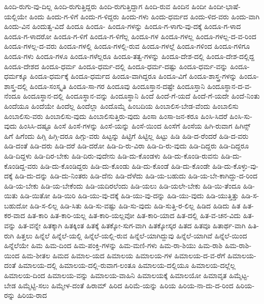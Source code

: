 {ಹಿಂದಿ-ರುಗು-ವು-ದಿಲ್ಲ
ಹಿಂದಿ-ರುಗುತ್ತಿದ್ದರು
ಹಿಂದಿ-ರುಗುತ್ತಿದ್ದಾಗ
ಹಿಂದಿ-ರುವ
ಹಿಂದಿನ
ಹಿಂದೀ
ಹಿಂದೀ-ಭಾಷೆ-ಯಲ್ಲಿಯೇ
ಹಿಂದು
ಹಿಂದು-ಗ-ಳಿಗೆ
ಹಿಂದು-ಗ-ಳಿದ್ದರು
ಹಿಂದು-ಗಳು
ಹಿಂದು-ಧರ್ಮದ
ಹಿಂದು-ಳಿದ-ವರು
ಹಿಂದು-ವಾಗಿ
ಹಿಂದು-ವಿನ
ಹಿಂದುತ್ವ-ವಿದೆ
ಹಿಂದೂ
ಹಿಂದೂ-
ಹಿಂದೂ-ಗಳನ್ನು
ಹಿಂದೂ-ಗ-ಳಾಗು-ವು-ದಕ್ಕೆ
ಹಿಂದೂ-ಗ-ಳಾದ
ಹಿಂದೂ-ಗ-ಳಾದರೋ
ಹಿಂದೂ-ಗ-ಳಿಗೆ
ಹಿಂದೂ-ಗ-ಳಿಗೆಲ್ಲ
ಹಿಂದೂ-ಗಳ
ಹಿಂದೂ-ಗಳಲ್ಲ
ಹಿಂದೂ-ಗಳಲ್ಲ-ದ-ವ-ರಿಂದ
ಹಿಂದೂ-ಗಳಲ್ಲ-ದ-ವರು
ಹಿಂದೂ-ಗಳಲ್ಲಿ
ಹಿಂದೂ-ಗಳಲ್ಲಿ-ರುವ
ಹಿಂದೂ-ಗಳಲ್ಲೆ
ಹಿಂದೂ-ಗಳಿಂದ
ಹಿಂದೂ-ಗಳಿಗೂ
ಹಿಂದೂ-ಗಳು
ಹಿಂದೂ-ಗಳೂ
ಹಿಂದೂ-ಗಳೆಲ್ಲರೂ
ಹಿಂದೂ-ತತ್ವ-ಗಳನ್ನು
ಹಿಂದೂ-ದೇಶ-ದಲ್ಲಿ
ಹಿಂದೂ-ದೇಶ-ದಲ್ಲಿದ್ದ
ಹಿಂದೂ-ದೇಶದ
ಹಿಂದೂ-ಧರ್ಮ
ಹಿಂದೂ-ಧರ್ಮ-ದಲ್ಲಿ
ಹಿಂದೂ-ಧರ್ಮ-ದಷ್ಟು
ಹಿಂದೂ-ಧರ್ಮ-ವನ್ನು
ಹಿಂದೂ-ಧರ್ಮಕ್ಕೂ
ಹಿಂದೂ-ಧರ್ಮಕ್ಕೆ
ಹಿಂದೂ-ಧರ್ಮದ
ಹಿಂದೂ-ವಾಗಿದ್ದರೂ
ಹಿಂದೂ-ವಿಗೆ
ಹಿಂದೂ-ಶಾಸ್ತ್ರ-ಗಳನ್ನು
ಹಿಂದೂ-ಶಾಸ್ತ್ರ-ದಲ್ಲಿ
ಹಿಂದೂ-ಸಂಸ್ಕೃತಿ
ಹಿಂದೂ-ಸಾ-ಗರ
ಹಿಂದೂವು
ಹಿಂದೂಸ್ತಾನ-ದಷ್ಟೇ
ಹಿಂದೂಸ್ತಾನಿ
ಹಿಂದೂಸ್ಥಾನ-ದ-ವ-ನೆಂದೂ
ಹಿಂದೂಸ್ಥಾನ-ದಲ್ಲಿ
ಹಿಂದೂಸ್ಥಾನ-ವನ್ನು
ಹಿಂದೂಸ್ಥಾನಿ
ಹಿಂದೆ
ಹಿಂದೆ-ಗೆ-ಯದೆ
ಹಿಂದೆ-ಗೆ-ಯದೇ
ಹಿಂದೆ-ನಿಂತು
ಹಿಂದೆಯೂ
ಹಿಂದೆಯೇ
ಹಿಂದೆಲ್ಲ
ಹಿಂದೆಲ್ಲಾ
ಹಿಂದೊಮ್ಮೆ
ಹಿಂಬದಿಯ
ಹಿಂಬಾಲಿಸ-ಬೇಡ-ವೆಂದು
ಹಿಂಬಾಲಿಸು
ಹಿಂಬಾಲಿಸು-ವರು
ಹಿಂಬಾಲಿಸು-ವುದು
ಹಿಂಬಾಲಿಸುತ್ತಿರು-ವುದು
ಹಿಂಸಾ
ಹಿಂಸಾ-ಜನ-ಕರೂ
ಹಿಂಸಿ-ಸಿದರೆ
ಹಿಂಸಿ-ಸು-ವುದು
ಹಿಂಸಿಸಿ-ದಷ್ಟೂ
ಹಿಂಸೆ
ಹಿಂಸೆ-ಗಳನ್ನು
ಹಿಂಸೆ-ಯನ್ನು
ಹಿಂಸೆ-ಯಿಂದ
ಹಿಂಸೆಗೆ
ಹಿಂಸೆಯ
ಹಿಗಿ-ರುವಾಗ
ಹಿಗಿನ್ಸ್
ಹಿಗೆ
ಹಿಗೆಂದು
ಹಿಗ್ಗಿ
ಹಿಗ್ಗಿ-ದರೂ
ಹಿಗ್ಗು-ವರು
ಹಿಟ್ಟನ್ನು
ಹಿಟ್ಟಿಗೆ
ಹಿಟ್ಟಿಲ್ಲ
ಹಿಟ್ಟು
ಹಿಡಿ
ಹಿಡಿ-ದ-ರೆಂದರೆ
ಹಿಡಿ-ದ-ವರು
ಹಿಡಿ-ದಂತೆ
ಹಿಡಿ-ದರು
ಹಿಡಿ-ದರೆ
ಹಿಡಿ-ದರೋ
ಹಿಡಿ-ದಿ-ರು-ವಿರಾ
ಹಿಡಿ-ದಿ-ರು-ವುದು
ಹಿಡಿ-ದಿದ್ದರು
ಹಿಡಿ-ದಿದ್ದರೂ
ಹಿಡಿ-ದಿದ್ದಳು
ಹಿಡಿ-ದಿರ-ಬೇಕು
ಹಿಡಿ-ದಿರು-ವುದೇನು
ಹಿಡಿ-ದು-ಕೊಂಡಳು
ಹಿಡಿ-ದು-ಕೊಂಡಿ-ರುವನು
ಹಿಡಿ-ದು-ಕೊಂಡಿದ್ದ-ವರು
ಹಿಡಿ-ದು-ಕೊಂಡಿದ್ದರು
ಹಿಡಿ-ದು-ಕೊಂಡು
ಹಿಡಿ-ದು-ಕೊಂಡೆ
ಹಿಡಿ-ದು-ಕೊಂಡೇ
ಹಿಡಿ-ದು-ಕೊಳ್ಳು-ವು-ದಕ್ಕೆ
ಹಿಡಿ-ದು-ದನ್ನು
ಹಿಡಿ-ದು-ನಿಂತರು
ಹಿಡಿ-ದೆನು
ಹಿಡಿ-ದೆಳೆದು
ಹಿಡಿ-ಯ-ಬಹುದು
ಹಿಡಿ-ಯ-ಬೇ-ಕಾಗಿದ್ದು-ದ-ರಿಂದ
ಹಿಡಿ-ಯ-ಬೇಕು
ಹಿಡಿ-ಯ-ಬೇಕೆಂದು
ಹಿಡಿ-ಯದಿರಲೆಂದು
ಹಿಡಿ-ಯಲು
ಹಿಡಿ-ಯಲೇ-ಬೇಕು
ಹಿಡಿ-ಯಿ-ತೆಂದೂ
ಹಿಡಿ-ಯಿತು
ಹಿಡಿ-ಯಿತೋ
ಹಿಡಿ-ಯಿರಿ
ಹಿಡಿ-ಯು-ವು-ದಕ್ಕೆ
ಹಿಡಿ-ಯು-ವು-ದನ್ನು
ಹಿಡಿ-ಯು-ವುದು
ಹಿಡಿ-ಯುತ್ತಿತ್ತು
ಹಿಡಿ-ಸ-ಬಹುದೋ
ಹಿಡಿ-ಸ-ಲಿಲ್ಲ
ಹಿಡಿ-ಸಿತು
ಹಿಡಿ-ಸು-ವಷ್ಟು
ಹಿಡಿ-ಸು-ವುದು
ಹಿಡಿ-ಸುತ್ತಿ-ರ-ಲಿಲ್ಲ
ಹಿಡಿದ
ಹಿಡಿದು
ಹಿತ
ಹಿತ-ಕರ-ವಾದ
ಹಿತ-ಕಾರಿ
ಹಿತ-ಕಾರಿ-ಯಲ್ಲ
ಹಿತ-ಕಾರಿ-ಯಲ್ಲವೋ
ಹಿತ-ಕಾರಿ-ಯಾದ
ಹಿತ-ದಲ್ಲಿ
ಹಿತ-ವ-ಚನ-ವಿದು
ಹಿತ-ವನ್ನು
ಹಿತ-ವನ್ನೇ
ಹಿತಕ್ಕಾಗಿ
ಹಿತಕ್ಕಿಂತ
ಹಿತಕ್ಕೆ
ಹಿತಕ್ಕೋ-ಸುಗ-ವಾಗಿ
ಹಿತಕ್ಕೋಸ್ಕರ
ಹಿತದ
ಹಿತವೂ
ಹಿತಾರ್ಥ-ವಾಗಿ
ಹಿತಿ-ರುಗಿ
ಹಿತ್ತಲು
ಹಿನ್ನೆಲೆ
ಹಿನ್ನೆಲೆ-ಯಲ್ಲಿ
ಹಿನ್ನೆಲೆ-ಯಲ್ಲಿ-ರುವ
ಹಿನ್ನೆಲೆ-ಯಾಗಿದ್ದುವು
ಹಿನ್ನೆಲೆ-ಯಾಗಿವೆ
ಹಿನ್ನೆಲೆ-ಯಿಂದ
ಹಿನ್ನೆಲೆಯೇ
ಹಿಮ
ಹಿಮ-ದಿಂದ
ಹಿಮ-ಪಂಕ್ತಿ-ಗಳನ್ನು
ಹಿಮ-ಮಣಿ-ಗಳು
ಹಿಮ-ರಾ-ಶಿಯು
ಹಿಮ-ರಾಶಿ
ಹಿಮ-ರಾಶಿ-ಯಿಂದ
ಹಿಮ-ಶೀತಲ
ಹಿಮದ
ಹಿಮಾಲ-ಯದ
ಹಿಮಾಲಯ
ಹಿಮಾಲಯ-ಗಳ
ಹಿಮಾಲಯ-ದ-ವ-ರೆಗೆ
ಹಿಮಾಲಯ-ದಂತೆ
ಹಿಮಾಲಯ-ದಲ್ಲಿ
ಹಿಮಾಲಯ-ದಲ್ಲಿ-ರುವಾಗ-ಲಂತೂ
ಹಿಮಾಲಯ-ದಲ್ಲಿಯೂ
ಹಿಮಾಲಯ-ದಲ್ಲೆಲ್ಲ
ಹಿಮಾಲಯ-ದಿಂದ
ಹಿಮಾಲಯ-ವನ್ನು
ಹಿಮಾಲಯ-ವಾಹಿನಿ
ಹಿಮಾಲಯಕ್ಕೆ
ಹಿಮಾಲಯೋ
ಹಿಮಾವೃತ
ಹಿಮ್ಮೆಟ್ಟ-ಬೇಡ
ಹಿಮ್ಮೆಟ್ಟಿ-ಸಲು
ಹಿಮ್ಮೇಳ-ದಂತೆ
ಹಿರಾಮ್
ಹಿರಿದ
ಹಿರಿಮೆ-ಯನ್ನು
ಹಿರಿಯ
ಹಿರಿಯ-ನಾ-ದು-ದ-ರಿಂದ
ಹಿರಿಯ-ರನ್ನು
ಹಿರಿಯ-ರಾದ
}
